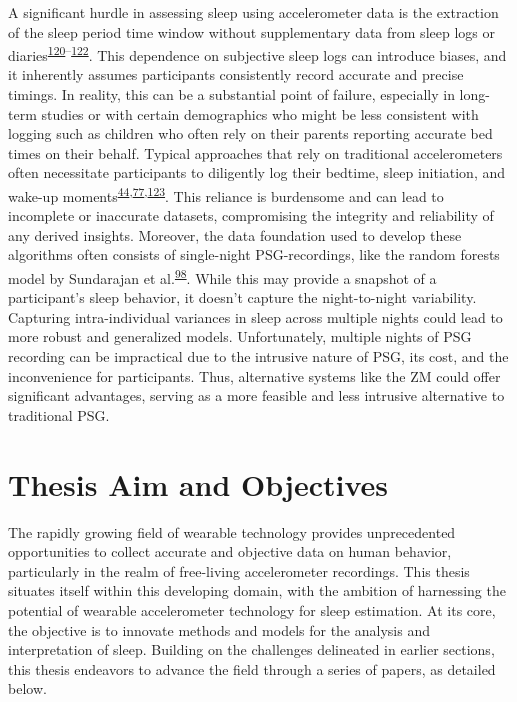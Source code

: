 \documentclass[
  10pt,
]{scrbook}
\begin{document}
A significant hurdle in assessing sleep using accelerometer data is the
extraction of the sleep period time window without supplementary data
from sleep logs or
diaries\textsuperscript{\protect\hyperlink{ref-doherty_large_2017}{120}--\protect\hyperlink{ref-anderson_assessment_2014}{122}}.
This dependence on subjective sleep logs can introduce biases, and it
inherently assumes participants consistently record accurate and precise
timings. In reality, this can be a substantial point of failure,
especially in long-term studies or with certain demographics who might
be less consistent with logging such as children who often rely on their
parents reporting accurate bed times on their behalf. Typical approaches
that rely on traditional accelerometers often necessitate participants
to diligently log their bedtime, sleep initiation, and wake-up
moments\textsuperscript{\protect\hyperlink{ref-girschik_validation_2012}{44},\protect\hyperlink{ref-littner_2003}{77},\protect\hyperlink{ref-lockley_1999}{123}}.
This reliance is burdensome and can lead to incomplete or inaccurate
datasets, compromising the integrity and reliability of any derived
insights. Moreover, the data foundation used to develop these algorithms
often consists of single-night PSG-recordings, like the random forests
model by Sundarajan et
al.\textsuperscript{\protect\hyperlink{ref-sundararajan_sleep_2021}{98}}.
While this may provide a snapshot of a participant's sleep behavior, it
doesn't capture the night-to-night variability. Capturing
intra-individual variances in sleep across multiple nights could lead to
more robust and generalized models. Unfortunately, multiple nights of
PSG recording can be impractical due to the intrusive nature of PSG, its
cost, and the inconvenience for participants. Thus, alternative systems
like the ZM could offer significant advantages, serving as a more
feasible and less intrusive alternative to traditional PSG.

\hypertarget{thesis-aim-and-objectives}{%
\section{Thesis Aim and Objectives}\label{thesis-aim-and-objectives}}

The rapidly growing field of wearable technology provides unprecedented
opportunities to collect accurate and objective data on human behavior,
particularly in the realm of free-living accelerometer recordings. This
thesis situates itself within this developing domain, with the ambition
of harnessing the potential of wearable accelerometer technology for
sleep estimation. At its core, the objective is to innovate methods and
models for the analysis and interpretation of sleep. Building on the
challenges delineated in earlier sections, this thesis endeavors to
advance the field through a series of papers, as detailed below.
\end{document}
